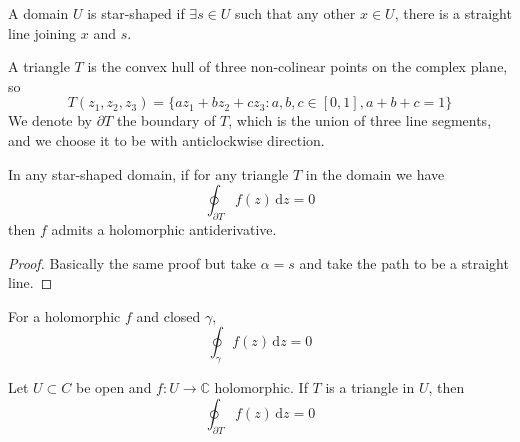 \begin{definition}
    A domain $U$ is star-shaped if $\exists s\in U$ such that any other $x\in U$, there is a straight line joining $x$ and $s$.
\end{definition}
\begin{definition}
    A triangle $T$ is the convex hull of three non-colinear points on the complex plane, so
    $$T(z_1,z_2,z_3)=\{az_1+bz_2+cz_3:a,b,c\in [0,1],a+b+c=1\}$$
    We denote by $\partial T$ the boundary of $T$, which is the union of three line segments, and we choose it to be with anticlockwise direction. 
\end{definition}
\begin{corollary}
    In any star-shaped domain, if for any triangle $T$ in the domain we have
    $$\oint_{\partial T}f(z)\,\mathrm dz=0$$
    then $f$ admits a holomorphic antiderivative.
\end{corollary}
\begin{proof}
    Basically the same proof but take $\alpha=s$ and take the path to be a straight line.
\end{proof}
\begin{theorem}
    For a holomorphic $f$ and closed $\gamma$,
    $$\oint_\gamma f(z)\,\mathrm dz=0$$
\end{theorem}
\begin{theorem}
    Let $U\subset C$ be open and $f:U\to\mathbb C$ holomorphic.
    If $T$ is a triangle in $U$, then
    $$\oint_{\partial T}f(z)\,\mathrm dz=0$$
\end{theorem}
